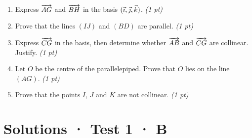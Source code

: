 \begin{enumerate}

\item Express $\overrightarrow{AG}$ and $\overrightarrow{BH}$ in the basis $(\vec{\imath},\vec{\jmath},\vec k)$. \hfill\textit{(1 pt)}

\item Prove that the lines $(IJ)$ and $(BD)$ are parallel. \hfill\textit{(1 pt)}

\item Express $\overrightarrow{CG}$ in the basis, then determine whether $\overrightarrow{AB}$ and $\overrightarrow{CG}$ are collinear. Justify. \hfill\textit{(1 pt)}

\item Let $O$ be the centre of the parallelepiped. Prove that $O$ lies on the line $(AG)$. \hfill\textit{(1 pt)}

\item Prove that the points $I$, $J$ and $K$ are not collinear. \hfill\textit{(1 pt)}

\end{enumerate}

\ifprof\clearpage

\section*{Solutions · Test 1 · B}\label{cor:1-4}

